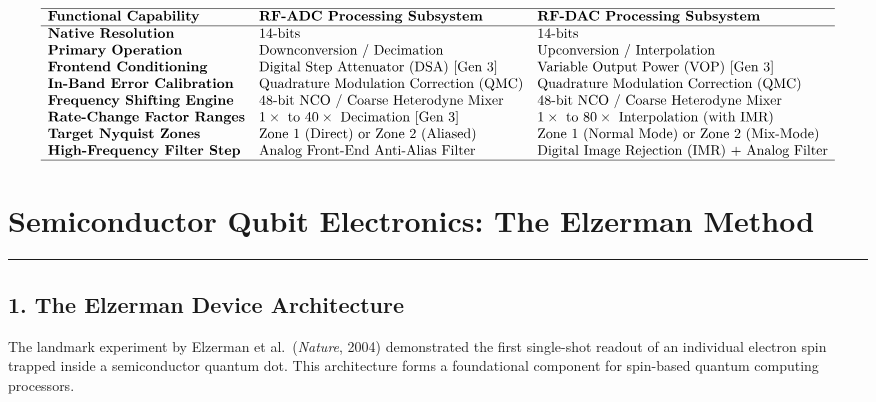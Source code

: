\documentclass[
]{article}
\begin{document}
\[\begin{array}{lll}
\hline
\textbf{Functional Capability} & \textbf{RF-ADC Processing Subsystem} & \textbf{RF-DAC Processing Subsystem} \\ \hline
\textbf{Native Resolution} & 14\text{-bits} & 14\text{-bits} \\
\textbf{Primary Operation} & \text{Downconversion / Decimation} & \text{Upconversion / Interpolation} \\
\textbf{Frontend Conditioning} & \text{Digital Step Attenuator (DSA) [Gen 3]} & \text{Variable Output Power (VOP) [Gen 3]} \\
\textbf{In-Band Error Calibration} & \text{Quadrature Modulation Correction (QMC)} & \text{Quadrature Modulation Correction (QMC)} \\
\textbf{Frequency Shifting Engine} & \text{48-bit NCO / Coarse Heterodyne Mixer} & \text{48-bit NCO / Coarse Heterodyne Mixer} \\
\textbf{Rate-Change Factor Ranges} & 1\times \text{ to } 40\times \text{ Decimation [Gen 3]} & 1\times \text{ to } 80\times \text{ Interpolation (with IMR)} \\
\textbf{Target Nyquist Zones} & \text{Zone 1 (Direct) or Zone 2 (Aliased)} & \text{Zone 1 (Normal Mode) or Zone 2 (Mix-Mode)} \\
\textbf{High-Frequency Filter Step} & \text{Analog Front-End Anti-Alias Filter} & \text{Digital Image Rejection (IMR) + Analog Filter} \\ \hline
\end{array}\]

\section{Semiconductor Qubit Electronics: The Elzerman
Method}\label{semiconductor-qubit-electronics-the-elzerman-method}

\begin{center}\rule{0.5\linewidth}{0.5pt}\end{center}

\subsection{1. The Elzerman Device
Architecture}\label{the-elzerman-device-architecture}

The landmark experiment by Elzerman et al.~(\emph{Nature}, 2004)
demonstrated the first single-shot readout of an individual electron
spin trapped inside a semiconductor quantum dot. This architecture forms
a foundational component for spin-based quantum computing processors.
\end{document}
